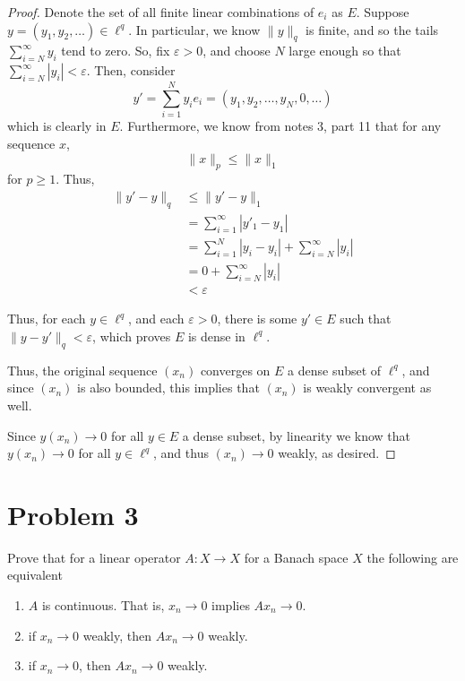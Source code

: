 \documentclass[fontsize=11pt]{scrartcl} %
\numberwithin{equation}{section} %
\numberwithin{figure}{section} %
\numberwithin{table}{section} %
\begin{document}
\begin{proof}
Denote the set of all finite linear combinations of $e_i$ as $E$.
Suppose $y = (y_1,y_2,\dots)\in\ell^q$. In particular, we know $\|y\|_q$ is
finite, and so the tails $\sum_{i=N}^{\infty}y_i$ tend to zero. So, fix
$\varepsilon>0$, and choose $N$ large enough so that $\sum_{i=N}^{\infty}|y_i| <
\varepsilon$. Then, consider
\[
    y' = \sum_{i=1}^N y_ie_i = (y_1,y_2,\dots,y_N,0,\dots)
\]
which is clearly in $E$. Furthermore, we know from notes 3, part 11 that for any
sequence $x$,
\[
 \|x\|_p \leq \|x\|_1
\]
for $p\geq 1$. Thus,
\[
    \begin{aligned}
        \|y'-y\|_q &\leq \|y'-y\|_1\\
        &=\sum_{i=1}^{\infty}|y'_1-y_1|\\
        &=\sum_{i=1}^{N}|y_i-y_i| + \sum_{i=N}^{\infty}|y_i|\\
        &=0+\sum_{i=N}^{\infty}|y_i|\\
        &< \varepsilon
    \end{aligned}
\]

Thus, for each $y\in \ell^q$, and each $\varepsilon > 0$, there is some $y'\in
E$ such that $\|y-y'\|_q <\varepsilon$, which proves $E$ is dense in $\ell^q$.

Thus, the original sequence $(x_n)$ converges on $E$ a dense subset of $\ell^q$,
and since $(x_n)$ is also bounded, this implies that $(x_n)$ is weakly
convergent as well.

Since $y(x_n)\to 0$ for all $y\in E$ a dense subset, by linearity we know that
$y(x_n)\to 0$ for all $y\in\ell^q$, and thus $(x_n)\to 0$ weakly, as desired.
\end{proof}

\newpage

\section*{Problem 3}
Prove that for a linear operator $A:X\to X$ for a Banach space $X$ the following
are equivalent
\begin{enumerate}
    \item $A$ is continuous. That is, $x_n\to 0$ implies $Ax_n\to 0$.
    \item if $x_n\to 0$ weakly, then $Ax_n\to 0$ weakly.
    \item if $x_n\to 0$, then $Ax_n\to 0$ weakly.
\end{enumerate}
\end{document}

